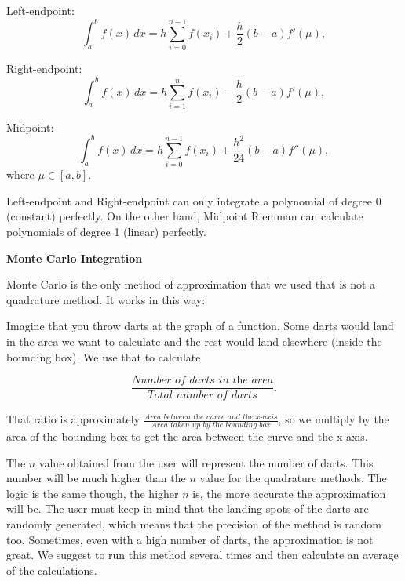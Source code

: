 \documentclass[12pt]{article}
\newcommand{\newLine}{\vspace{5mm}}
\newcommand{\integral}[3]{\text{$\int^{#2}_{#1} #3\,dx$}}
\newcommand{\summation}[3]{\text{$\sum^{#2}_{#1} #3$}}
\begin{document}
\newLine\noindent Left-endpoint:
\begin{equation*} 
\integral{a}{b}{f(x)} = h\summation{i = 0}{n - 1}{f(x_i)} + \frac{h}{2}(b-a)f'(\mu),
\end{equation*}

\noindent Right-endpoint:
\begin{equation*} 
\integral{a}{b}{f(x)} = h\summation{i = 1}{n}{f(x_i)} - \frac{h}{2}(b-a)f'(\mu),
\end{equation*}

\noindent Midpoint:
\begin{equation*} \integral{a}{b}{f(x)} = h\summation{i=0}{n-1}{f(x_i)} + \frac{h^2}{24}(b-a)f''(\mu), \end{equation*}
where $\mu\in[a,b]$.

Left-endpoint and Right-endpoint can only integrate a polynomial of degree 0 (constant) perfectly. On the other hand, Midpoint Riemman can calculate polynomials of degree 1 (linear) perfectly.

\newLine\noindent \textbf{Monte Carlo Integration}

Monte Carlo is the only method of approximation that we used that is not a quadrature method. It works in this way:

Imagine that you throw darts at the graph of a function. Some darts would land in the area we want to calculate and the rest would land elsewhere (inside the bounding box). We use that to calculate

\begin{equation*} \frac{\textit{Number of darts in the area}}{\textit{Total number of darts}}. \end{equation*}

\newLine\noindent That ratio is approximately $\frac{\textit{Area between the curve and the x-axis}}{\textit{Area taken up by the bounding box}}$, so we multiply by the area of the bounding box to get the area between the curve and the x-axis. 

The $n$ value obtained from the user will represent the number of darts. This number will be much higher than the $n$ value for the quadrature methods. The logic is the same though, the higher $n$ is, the more accurate the approximation will be. The user must keep in mind that the landing spots of the darts are randomly generated, which means that the precision of the method is random too. Sometimes, even with a high number of darts, the approximation is not great. We suggest to run this method several times and then calculate an average of the calculations.
\end{document}
